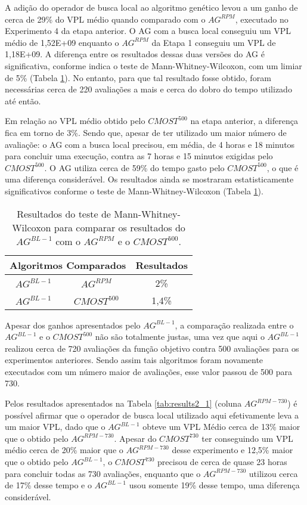 A adição do operador de busca local ao algoritmo genético levou a um ganho de cerca de 29\% do VPL médio quando comparado com o $AG^{RPM}$, executado no Experimento 4 da etapa anterior. O AG com a busca local conseguiu um VPL médio de 1,52E+09 enquanto o $AG^{RPM}$ da Etapa 1 conseguiu um VPL de 1,18E+09. A diferença entre os resultados dessas duas versões do AG é significativa, conforme indica o teste de Mann-Whitney-Wilcoxon, com um limiar de 5\% (Tabela \ref{tab:mw6_1}). No entanto, para que tal resultado fosse obtido, foram necessárias cerca de 220 avaliações a mais e cerca do dobro do tempo utilizado até então.

Em relação ao VPL médio obtido pelo $CMOST^{500}$ na etapa anterior, a diferença fica em torno de 3\%. Sendo que, apesar de ter utilizado um maior número de avaliaçõe: o AG com a busca local precisou, em média, de 4 horas e 18 minutos para concluir uma execução, contra as 7 horas e 15 minutos exigidas pelo $CMOST^{500}$. O AG utiliza cerca de 59\% do tempo gasto pelo $CMOST^{500}$, o que é uma diferença considerável. Os resultados ainda se mostraram estatisticamente significativos conforme o teste de Mann-Whitney-Wilcoxon  (Tabela \ref{tab:mw6_1}).

\begin{table}[H]
\centering
\caption{Resultados do teste de Mann-Whitney-Wilcoxon para comparar os resultados do $AG^{BL-1}$ com o $AG^{RPM}$ e o $CMOST^{500}$.}
\label{tab:mw6_1}
\begin{tabular}{|c|c|c|}
\hline
\multicolumn{2}{|c|}{Algoritmos Comparados} & Resultados \\ \hline
$AG^{BL-1}$ & $AG^{RPM}$ & 2\% \\ \hline
$AG^{BL-1}$ & $CMOST^{500}$ & 1,4\% \\ \hline

\end{tabular}
\end{table}

Apesar dos ganhos apresentados pelo $AG^{BL-1}$, a comparação realizada entre o $AG^{BL-1}$ e o $CMOST^{500}$ não são totalmente justas, uma vez que aqui o $AG^{BL-1}$ realizou cerca de 720 avaliações da função objetivo contra 500 avaliações para os experimentos anteriores. Sendo assim tais algoritmos foram novamente executados com um número maior de avaliações, esse valor passou de 500 para 730. 

Pelos resultados apresentados na Tabela \ref{tab:results2_1} (coluna $AG^{RPM-730}$) é possível afirmar que o operador de busca local utilizado aqui efetivamente leva a um maior VPL, dado que o $AG^{BL-1}$ obteve um VPL Médio cerca de 13\% maior que o obtido pelo $AG^{RPM-730}$. Apesar do $CMOST^{730}$ ter conseguindo um VPL médio cerca de 20\% maior que o $AG^{RPM-730}$ desse experimento e 12,5\% maior que o obtido pelo $AG^{BL-1}$, o $CMOST^{730}$ precisou de cerca de quase 23 horas para concluir todas as 730 avaliações, enquanto que o $AG^{RPM-730}$ utilizou cerca de 17\% desse tempo e o $AG^{BL-1}$ usou somente 19\% desse tempo, uma diferença considerável.

